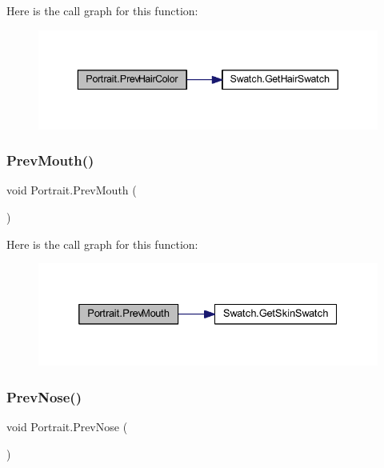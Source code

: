 Here is the call graph for this function\+:
\nopagebreak
\begin{figure}[H]
\begin{center}
\leavevmode
\includegraphics[width=343pt]{class_portrait_a29b9670f2b653ffe43cf81e94e90062a_cgraph}
\end{center}
\end{figure}
\mbox{\label{class_portrait_ac81c66115ce3df6a35af825e43742211}} 
\subsubsection{\texorpdfstring{PrevMouth()}{PrevMouth()}}
{\footnotesize\ttfamily void Portrait.\+Prev\+Mouth (\begin{DoxyParamCaption}{ }\end{DoxyParamCaption})}

Here is the call graph for this function\+:
\nopagebreak
\begin{figure}[H]
\begin{center}
\leavevmode
\includegraphics[width=332pt]{class_portrait_ac81c66115ce3df6a35af825e43742211_cgraph}
\end{center}
\end{figure}
\mbox{\label{class_portrait_afc5cd84e6086e462adb30f0d988c76b6}} 
\subsubsection{\texorpdfstring{PrevNose()}{PrevNose()}}
{\footnotesize\ttfamily void Portrait.\+Prev\+Nose (\begin{DoxyParamCaption}{ }\end{DoxyParamCaption})}

